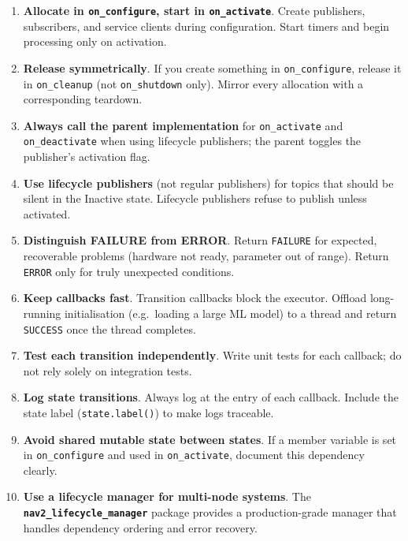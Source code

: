 \documentclass[12pt,a4paper]{article}
\newcommand{\code}[1]{\texttt{#1}}
\newcommand{\pkg}[1]{\textbf{\texttt{#1}}}
\begin{document}
\begin{enumerate}
  \item \textbf{Allocate in \code{on\_configure}, start in \code{on\_activate}}.
        Create publishers, subscribers, and service clients during configuration.
        Start timers and begin processing only on activation.

  \item \textbf{Release symmetrically}.  If you create something in
        \code{on\_configure}, release it in \code{on\_cleanup} (not
        \code{on\_shutdown} only).  Mirror every allocation with a
        corresponding teardown.

  \item \textbf{Always call the parent implementation} for
        \code{on\_activate} and \code{on\_deactivate} when using lifecycle
        publishers; the parent toggles the publisher's activation flag.

  \item \textbf{Use lifecycle publishers} (not regular publishers) for topics
        that should be silent in the Inactive state.  Lifecycle publishers
        refuse to publish unless activated.

  \item \textbf{Distinguish FAILURE from ERROR}.  Return \code{FAILURE} for
        expected, recoverable problems (hardware not ready, parameter out of
        range).  Return \code{ERROR} only for truly unexpected conditions.

  \item \textbf{Keep callbacks fast}.  Transition callbacks block the executor.
        Offload long-running initialisation (e.g.\ loading a large ML model)
        to a thread and return \code{SUCCESS} once the thread completes.

  \item \textbf{Test each transition independently}.  Write unit tests for each
        callback; do not rely solely on integration tests.

  \item \textbf{Log state transitions}.  Always log at the entry of each
        callback.  Include the state label (\code{state.label()}) to
        make logs traceable.

  \item \textbf{Avoid shared mutable state between states}.  If a member
        variable is set in \code{on\_configure} and used in
        \code{on\_activate}, document this dependency clearly.

  \item \textbf{Use a lifecycle manager for multi-node systems}.  The
        \pkg{nav2\_lifecycle\_manager} package provides a production-grade
        manager that handles dependency ordering and error recovery.
\end{enumerate}
\end{document}
